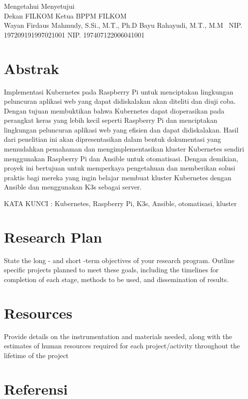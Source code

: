 \documentclass[a4paper,12pt]{article}
\begin{document}
\begin{flushleft}
Mengetahui \hspace{7.7cm} Menyetujui \\
Dekan FILKOM \hspace{6.85cm} Ketua BPPM FILKOM \\
\vspace{1.5cm}
Wayan Firdaus Mahmudy, S.Si., M.T., Ph.D \hspace{1.7cm} Bayu Rahayudi, M.T., M.M \
NIP. 197209191997021001 \hspace{6.05cm} NIP. 197407122006041001    
\end{flushleft}

\section*{Abstrak}
Implementasi Kubernetes pada Raspberry Pi untuk menciptakan lingkungan peluncuran aplikasi web yang dapat didiskalakan akan diteliti dan diuji coba. Dengan tujuan membuktikan bahwa Kubernetes dapat dioperasikan pada perangkat keras yang lebih kecil seperti Raspberry Pi dan menciptakan lingkungan peluncuran aplikasi web yang efisien dan dapat didiskalakan. Hasil dari penelitian ini akan dipresentasikan dalam bentuk dokumentasi yang memudahkan pemahaman dan mengimplementasikan kluster Kubernetes sendiri menggunakan Raspberry Pi dan Ansible untuk otomatisasi. Dengan demikian, proyek ini bertujuan untuk memperkaya pengetahuan dan memberikan solusi praktis bagi mereka yang ingin belajar membuat kluster Kubernetes dengan Ansible dan menggunakan K3s sebagai server.
\addcontentsline{toc}{section}{Abstrak}

\begin{flushleft}
KATA KUNCI : Kubernetes, Raspberry Pi, K3s, Ansible, otomatisasi, kluster 
\end{flushleft}
\newpage

\tableofcontents
\newpage

% 
% 




\section{Research Plan}
State the long - and short -term objectives of your research program. Outline specific projects planned to meet these goals, including the timelines for completion of each stage, methods to be used, and dissemination of results. 

\section{Resources}
Provide details on the instrumentation and materials needed, along with the estimates of human resources required for each project/activity throughout the lifetime of the project
\cite{cloud_computing}

\newpage
\section*{Referensi}
\printbibliography[heading=none]
\end{document}
